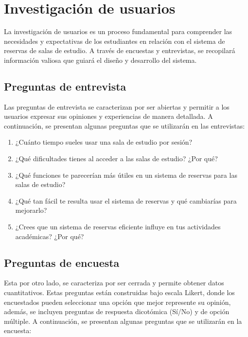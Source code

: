\documentclass{article}
\begin{document}
\newpage

\section{Investigación de usuarios}

La investigación de usuarios es un proceso fundamental para comprender las necesidades y expectativas de los estudiantes en relación con el sistema de reservas de salas de estudio. A través de encuestas y entrevistas, se recopilará información valiosa que guiará el diseño y desarrollo del sistema.
\vspace{-0.5cm}
\subsection{Preguntas de entrevista}

Las preguntas de entrevista se caracterizan por ser abiertas y permitir a los usuarios expresar sus opiniones y experiencias de manera detallada. A continuación, se presentan algunas preguntas que se utilizarán en las entrevistas:

\begin{enumerate}
  \item ¿Cuánto tiempo sueles usar una sala de estudio por sesión?
  \item ¿Qué dificultades tienes al acceder a las salas de estudio? ¿Por qué?
  \item ¿Qué funciones te parecerían más útiles en un sistema de reservas para las salas de estudio?
  \item ¿Qué tan fácil te resulta usar el sistema de reservas y qué cambiarías para mejorarlo?
  \item ¿Crees que un sistema de reservas eficiente influye en tus actividades académicas? ¿Por qué?
\end{enumerate}

\subsection{Preguntas de encuesta}

Esta por otro lado, se caracteriza por ser cerrada y permite obtener datos cuantitativos. Estas preguntas están construidas bajo escala Likert, donde los encuestados pueden seleccionar una opción que mejor represente su opinión, además, se incluyen preguntas de respuesta dicotómica (Sí/No) y de opción múltiple. A continuación, se presentan algunas preguntas que se utilizarán en la encuesta:
\end{document}
